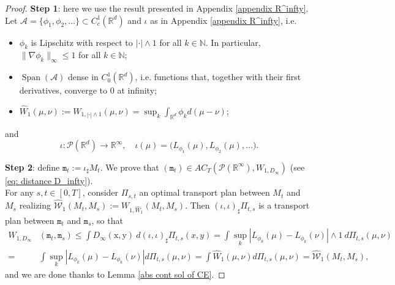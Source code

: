 \documentclass[10pt,leqno]{amsart}
\numberwithin{equation}{section}
\newcommand{\R}{\mathbb{R}}
\newcommand{\N}{\mathbb{N}}
\newcommand{\PP}{\mathcal{P}}
\begin{document}
\begin{proof}
    \textbf{Step 1}: here we use the result presented in Appendix \ref{appendix R^infty}. Let $\mathcal{A}=\{\phi_1,\phi_2,\dots \}\subset C_c^1(\R^d)$ and $\iota$ as in Appendix \ref{appendix R^infty}, i.e.
    \begin{itemize}
        \item $\phi_k$ is Lipschitz with respect to $|\cdot |\wedge 1$ for all $k\in \N$. In particular, $\|\nabla\phi_k\|_\infty\leq 1$ for all $k\in \N$;
        \item $\operatorname{Span}(\mathcal{A})$ dense in $C_0^1(\R^d)$, i.e. functions that, together with their first derivatives, converge to $0$ at infinity;
        \item $\hat{W}_1(\mu,\nu):= W_{1,|\cdot|\wedge 1}(\mu,\nu) = \sup_k\int_{\R^d}\phi_k d(\mu-\nu)$;
    \end{itemize}
    and
    \begin{equation}\label{iota Rd}
    \iota:\PP(\R^d) \to \R^\infty, \quad \iota(\mu) = \big(L_{\phi_1}(\mu), L_{\phi_2}(\mu),\dots \big).
    \end{equation} 

    
    \textbf{Step 2}: define $\mathtt{m}_t:= \iota_\sharp  M_t$. We prove that $(\mathtt{m}_t)\in AC_T(\PP(\R^\infty),W_{1,D_\infty})$ (see \eqref{eq: distance D_infty}).
    \\
    For any $s,t\in[0,T]$, consider $\Pi_{s,t}$ an optimal transport plan between $M_t$ and $M_s$ realizing $\hat{\mathcal{W}}_1(M_t,M_s):=W_{1,\hat{W}_1}(M_t,M_s)$. Then $(\iota,\iota)_\sharp \Pi_{t,s}$ is a transport plan between $\mathtt{m}_t$ and $\mathtt{m}_s$, so that 
    \begin{align*}
        W_{1,D_\infty} &(\mathtt{m}_t,\mathtt{m}_s) 
        \leq  \int D_{\infty}(\mathrm{x},\mathrm{y}) \ d(\iota,\iota)_\sharp \Pi_{t,s}(x,y)
        =  \int \sup_k |L_{\phi_k}(\mu) - L_{\phi_k}(\nu)| \wedge 1 \ d\Pi_{t,s}(\mu,\nu)
        \\
        = & \int \sup_k |L_{\phi_k}(\mu) - L_{\phi_k}(\nu)| d\Pi_{t,s}(\mu,\nu)
        =
        \int \hat{W}_1(\mu,\nu)d\Pi_{t,s}(\mu,\nu) 
        = \hat{\mathcal{W}}_1(M_t,M_s),
    \end{align*}
    and we are done thanks to Lemma \ref{abs cont sol of CE}.
    

\end{proof}
\end{document}

